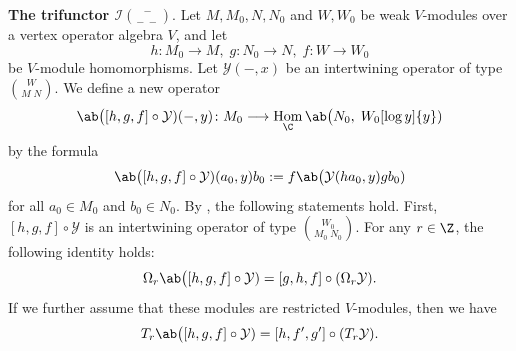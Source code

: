 \documentclass[12pt, english]{article}
\numberwithin{equation}{section}
\DeclareMathOperator{\Hom}{Hom}
\theoremstyle{plain}
\theoremstyle{definition}
\theoremstyle{remark}
\begin{document}
	\vspace{1\baselineskip}
	
	\noindent \textbf{ The trifunctor $\mathcal{I} \binom{-}{- \; -}$}. Let $M, M_0, N, N_0$ and $W, W_0$ be weak $V$-modules over a vertex operator algebra $V$,
	and let
	\[
	h \colon M_0 \longrightarrow M, \; g \colon N_0 \longrightarrow N, \; f \colon W \longrightarrow W_0
	\]
	be $V$-module homomorphisms.
	Let $\mathcal{Y}(-, x)$ be an intertwining operator of type $\binom{W}{M \; N}$.
	We define a new operator
	\[
	\ab\big([h, g, f] \circ \mathcal{Y}) (-, y) \colon M_0 \longrightarrow \Hom_{\C} \ab\big(N_0, \; W_0 [\log y] \{y\})
	\]
	by the formula
	\begin{equation}
		\ab\big([h, g, f] \circ \mathcal{Y}) (a_0, y) b_0 := f \ab\big(\mathcal{Y}(ha_0, y) g b_0)
	\end{equation}
	for all $a_0 \in M_0$ and $b_0 \in N_0$.
	By \cite[Lemma 3.6]{YZ26}, the following statements hold.
	First, $ [h, g, f] \circ \mathcal{Y} $  is an intertwining operator of type $ \binom{W_0}{M_0 \; N_0}$.
	For any $r \in \Z$, the following identity holds:
	\begin{equation}
		\Omega_r \ab\big([h, g, f] \circ \mathcal{Y})
		=
		[g, h, f] \circ(\Omega_r\mathcal{Y}).
		\label{eq:skew-symmetry-naturality}
	\end{equation}
	If we further assume that these modules are restricted $V$-modules, then we have
	\begin{equation}
		T_r \ab\big([h, g, f] \circ\mathcal{Y}) = [h, f^\prime, g^\prime] \circ (T_r \mathcal{Y}).
		\label{eq:contragredient-naturality}
	\end{equation}
	
\end{document}
